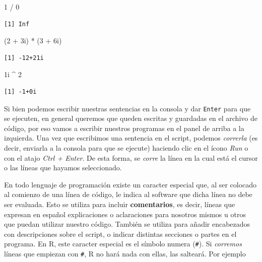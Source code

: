 \documentclass[
]{book}
\newenvironment{Shaded}{\begin{snugshade}}{\end{snugshade}}
\newcommand{\DecValTok}[1]{\textcolor[rgb]{0.00,0.00,0.81}{#1}}
\newcommand{\NormalTok}[1]{#1}
\newcommand{\SpecialCharTok}[1]{\textcolor[rgb]{0.00,0.00,0.00}{#1}}
\begin{document}
\begin{Shaded}
\begin{Highlighting}[]
\DecValTok{1} \SpecialCharTok{/} \DecValTok{0}
\end{Highlighting}
\end{Shaded}

\begin{verbatim}
[1] Inf
\end{verbatim}

\begin{Shaded}
\begin{Highlighting}[]
\NormalTok{(}\DecValTok{2} \SpecialCharTok{+}\NormalTok{ 3i) }\SpecialCharTok{*}\NormalTok{ (}\DecValTok{3} \SpecialCharTok{+}\NormalTok{ 6i)}
\end{Highlighting}
\end{Shaded}

\begin{verbatim}
[1] -12+21i
\end{verbatim}

\begin{Shaded}
\begin{Highlighting}[]
\NormalTok{1i }\SpecialCharTok{\^{}} \DecValTok{2}
\end{Highlighting}
\end{Shaded}

\begin{verbatim}
[1] -1+0i
\end{verbatim}

Si bien podemos escribir nuestras sentencias en la consola y dar \texttt{Enter} para que se ejecuten, en general queremos que queden escritas y guardadas en el archivo de código, por eso vamos a escribir nuestros programas en el panel de arriba a la izquierda. Una vez que escribimos una sentencia en el script, podemos \emph{correrla} (es decir, enviarla a la consola para que se ejecute) haciendo clic en el ícono \emph{Run} o con el atajo \emph{Ctrl + Enter}. De esta forma, se \emph{corre} la línea en la cual está el cursor o las líneas que hayamos seleccionado.

En todo lenguaje de programación existe un caracter especial que, al ser colocado al comienzo de una línea de código, le indica al software que dicha línea no debe ser evaluada. Esto se utiliza para incluir \textbf{comentarios}, es decir, líneas que expresan en español explicaciones o aclaraciones para nosotros mismos u otros que puedan utilizar nuestro código. También se utiliza para añadir encabezados con descripciones sobre el script, o indicar distintas secciones o partes en el programa. En R, este caracter especial es el símbolo numera (\texttt{\#}). Si \emph{corremos} líneas que empiezan con \texttt{\#}, R no hará nada con ellas, las salteará. Por ejemplo
\end{document}
